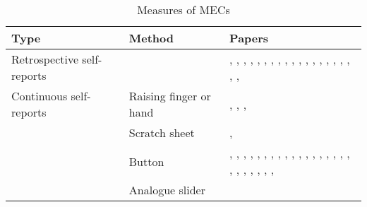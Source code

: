 \begin{table}[t!]
\centering
\scriptsize
\def\arraystretch{1.2}

\begin{threeparttable}
\caption{Measures of MECs}
\label{tab:rev-1}

\begin{tabular*}{\textwidth}{
    >{\raggedright}p{}
    >{\raggedright}p{}
    >{\raggedright\arraybackslash}p{}}

\hline

\textbf{Type} & \textbf{Method} & \textbf{Papers} \\ 

\hline
Retrospective self-reports & & 
    \textcite{bannister2019}, \textcite{blood2001}, \textcite{carr2016}, \textcite{chabin2020}, \textcite{goodchild2019}, \textcite{honda2020}, \textcite{jaimovich2013}, \textcite{ji2019}, \textcite{juslin2014}, \textcite{park2019}, \textcite{polo2017}, \textcite{schafer2011}, \textcite{schoeller2016}, \textcite{schoeller2018a}, \textcite{schoeller2019a}, \textcite{seibt2017}, \textcite{silvia2015}, \textcite{solberg2019}, \textcite{strick2015}, \textcite{wassiliwizky2015}, \textcite{weth2015} \\ 

\hline    
Continuous self-reports & Raising finger or hand & 
    \textcite{craig2005}, \textcite{goldstein1980}, \textcite{konecni2007b}, \textcite{panksepp1995} \\

\cline{2-3}
& Scratch sheet & 
    \textcite{baltes2011}, \textcite{baltes2014} \\

\cline{2-3}    
& Button & 
    \textcite{bannister2020b}, \textcite{beier2020}, \textcite{colver2016}, \textcite{egermann2011}, \textcite{ferreri2019}, \textcite{grewe2007}, \textcite{grewe2009a}, \textcite{grewe2011}, \textcite{guhn2007}, \textcite{laeng2016}, \textcite{masherrero2014}, \textcite{mori2014b}, \textcite{mori2015}, \textcite{mori2017}, \textcite{nagel2008}, \textcite{polo2017}, \textcite{rickard2004}, \textcite{sachs2016}, \textcite{salimpoor2009}, \textcite{salimpoor2011}, \textcite{schubert2018}, \textcite{seibt2018}, \textcite{starcke2019}, \textcite{sutherland2009}, \textcite{wassiliwizky2017b}, \textcite{zickfeld2019a} \\
    
\cline{2-3}
& Analogue slider & 
    \textcite{bannister2018} \\


\end{tabular*}
\end{threeparttable}
\end{table}
